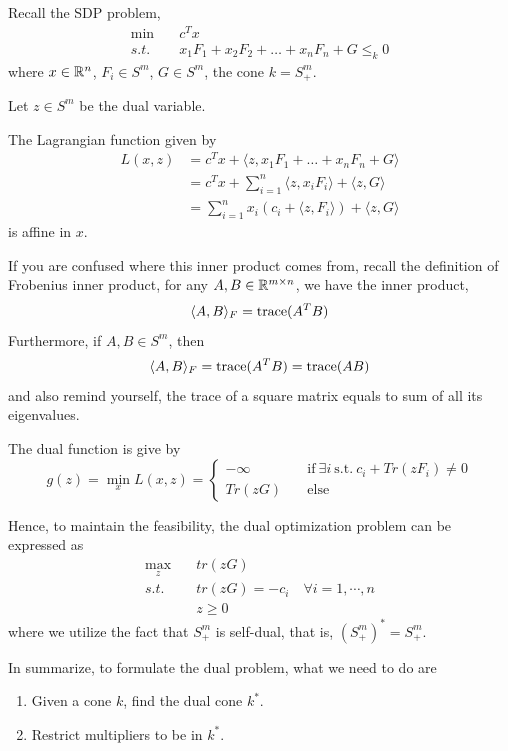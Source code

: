 \begin{example}
Recall the SDP problem,
\begin{align*}
\min\quad &c^Tx\\
s.t.\quad &x_1F_1+x_2F_2+\ldots+x_nF_n+G\leq_k 0
\end{align*}
where $x\in\mathbb{R}^n$, $F_i\in S^m$, $G\in S^m$, the cone $k=S^m_+$.


Let $z\in S^m$ be the dual variable.

The Lagrangian function given by
\begin{align*}
L(x,z) &= c^Tx + \langle z,x_1F_1+\ldots +x_nF_n+G\rangle \\
&= c^Tx + \sum^n_{i=1}\langle z,x_iF_i\rangle+\langle z,G\rangle\\
&= \sum^n_{i=1}x_i(c_i+\langle z, F_i\rangle)+\langle z,G\rangle
\end{align*}
is affine in $x$.

If you are confused where this inner product comes from, recall the definition of Frobenius inner product, for any $A, B\in\mathbb{R}^{m\times n}$, we have the inner product,
$$\langle A, B\rangle_F = \operatorname{trace} (A^T B)$$
Furthermore, if $A, B\in S^m$, then
$$\langle A, B\rangle_F = \operatorname{trace} (A^T B)=\operatorname{trace} (A B) $$
and also remind yourself, the trace of a square matrix equals to sum of all its eigenvalues.

The dual function is give by
\begin{equation*}
g(z) = \min_x L(x,z)=\left\{
\begin{aligned}
-\infty &\quad\text{if}\ \exists i\ \text{s.t.}\ c_i+Tr(zF_i)\neq 0 \\
Tr(zG) & \quad\text{else}
\end{aligned}
\right.
\end{equation*}

Hence, to maintain the feasibility, the dual optimization problem can be expressed as
\begin{align*}
\max_z\quad &tr(zG)\\
s.t.\quad &tr(zG)=-c_i\quad \forall i=1,\cdots,n\\
&z\geq 0
\end{align*}
where we utilize the fact that $S_+^m$ is self-dual, that is, $(S_+^m)^*= S_+^m$.

In summarize, to formulate the dual problem, what we need to do are
\begin{enumerate}
	\item Given a cone $k$, find the dual cone $k^*$.
	
	\item Restrict multipliers to be in $k^*$.
\end{enumerate}

\end{example}

%





